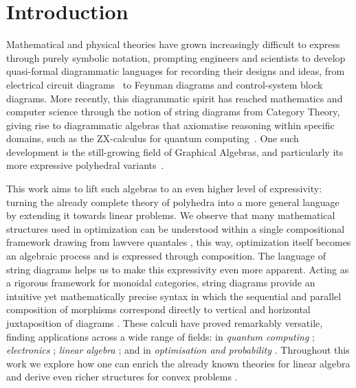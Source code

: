 \section{Introduction}

Mathematical and physical theories have grown increasingly difficult to express through purely symbolic notation, prompting engineers and scientists to develop quasi-formal diagrammatic languages for recording their designs and ideas, from electrical circuit diagrams~\cite{baez2018compositional} to Feynman diagrams and control-system block diagrams. More recently, this diagrammatic spirit has reached mathematics and computer science through the notion of string diagrams from Category Theory, giving rise to diagrammatic algebras that axiomatise reasoning within specific domains, such as the ZX-calculus for quantum computing~\cite{coecke2011interacting}. One such development is the still-growing field of Graphical Algebras, and particularly its more expressive polyhedral variants~\cite{bonchi2021polyhedral}.

This work aims to lift such algebras to an even higher level of expressivity: turning the already complete theory of polyhedra into a more general language by extending it towards linear problems. We observe that
many mathematical structures used in optimization can be understood within
a single compositional framework \cite{stein2024compositional,hanks2024compositionalopt} drawing from 
lawvere quantales \cite{lawvere1973metric},
this way, optimization itself becomes an algebraic process and is expressed through composition.
The language of string diagrams \cite{joyal1991geometry,selinger2010survey,piedeleu2023introductionstringdiagramscomputer} helps us to make this expressivity even more apparent.
Acting as a rigorous framework for
monoidal categories, string diagrams provide an intuitive yet mathematically
precise syntax in which the sequential and parallel composition of morphisms
correspond directly to vertical and horizontal juxtaposition of diagrams
\cite{joyal1991geometry,maclane1998categories}. These calculi have proved remarkably versatile, finding applications across a
wide range of fields: in \emph{quantum computing} \cite{coecke2011interacting};
\emph{electronics} \cite{baez2018compositional}; \emph{linear algebra} \cite{bonchi2017interacting,bonchi2019affine,defreitas2025generalizinginvertiblematrixtheorem,Paixao2020CalculationalPI};
and in \emph{optimisation and probability} \cite{stein2024gqa,stein2025compositional,bonchi2021polyhedral}. Throughout this work
we explore how one can enrich the already known theories for linear
algebra \cite{bonchi2017interacting} and derive even richer structures for convex problems \cite{stein2024compositional}.

